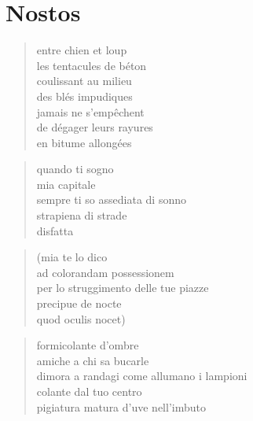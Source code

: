 \chapter*{Nostos}


\begin{otherlanguage}{french}
    \begin{verse}
        entre chien et loup\\
        les tentacules de béton\\
        coulissant au milieu\\
        des blés impudiques\\
        jamais ne s'empêchent\\
        de dégager leurs rayures\\
        en bitume allongées
    \end{verse}
\end{otherlanguage}

\clearpage


\begin{verse}
    quando ti sogno\\
    mia capitale\\
    sempre ti so assediata di sonno\\
    strapiena di strade\\
    disfatta
\end{verse}

\begin{verse}
    (mia te lo dico\\
    ad colorandam possessionem\\
    per lo struggimento delle tue piazze\\
    precipue de nocte\\
    quod oculis nocet)
\end{verse}

\begin{verse}
    formicolante d'ombre\\
    amiche a chi sa bucarle\\
    dimora a randagi come allumano i lampioni\\
    colante dal tuo centro\\
    pigiatura matura d'uve nell'imbuto
\end{verse}

\clearpage


